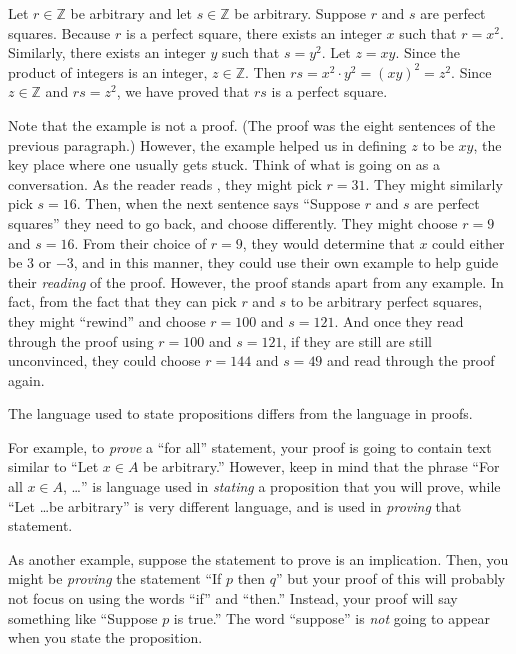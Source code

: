 \documentclass{book}
\theoremstyle{ekimcustom}
\begin{document}
Let $r \in \mathbb{Z}$ be arbitrary and let $s \in \mathbb{Z}$ be arbitrary. Suppose $r$ and $s$ are perfect squares. Because $r$ is a perfect square, there exists an integer $x$ such that $r=x^2$. Similarly, there exists an integer $y$ such that $s=y^2$. Let $z=xy$. Since the product of integers is an integer, $z \in \mathbb{Z}$. Then $rs = x^2 \cdot y^2 = (xy)^2 = z^2$. Since $z \in \mathbb{Z}$ and $rs=z^2$, we have proved that $rs$ is a perfect square.

Note that the example is not a proof. (The proof was the eight sentences of the previous paragraph.) However, the example helped us in defining $z$ to be $xy$, the key place where one usually gets stuck. Think of what is going on as a conversation. As the reader reads , they might pick $r=31$. They might similarly pick $s=16$. Then, when the next sentence says ``Suppose $r$ and $s$ are perfect squares'' they need to go back, and choose differently. They might choose $r=9$ and $s=16$. From their choice of $r=9$, they would determine that $x$ could either be $3$ or $-3$, and in this manner, they could use their own example to help guide their \emph{reading} of the proof. However, the proof stands apart from any example. In fact, from the fact that they can pick $r$ and $s$ to be arbitrary perfect squares, they might ``rewind'' and choose $r=100$ and $s=121$. And once they read through the proof using $r=100$ and $s=121$, if they are still are still unconvinced, they could choose $r=144$ and $s=49$ and read through the proof again.

\begin{bhabit}{}{}
The language used to state propositions differs from the language in proofs.
\end{bhabit}
For example, to \emph{prove} a ``for all'' statement, your proof is going to contain text similar to ``Let $x \in A$ be arbitrary.'' However, keep in mind that the phrase ``For all $x \in A$, \dots'' is language used in \emph{stating} a proposition that you will prove, while ``Let \dots be arbitrary'' is very different language, and is used in \emph{proving} that statement.

As another example, suppose the statement to prove is an implication. Then, you might be \emph{proving} the statement ``If $p$ then $q$'' but your proof of this will probably not focus on using the words ``if'' and ``then.'' Instead, your proof will say something like ``Suppose $p$ is true.'' The word ``suppose'' is \emph{not} going to appear when you state the proposition.
\end{document}
